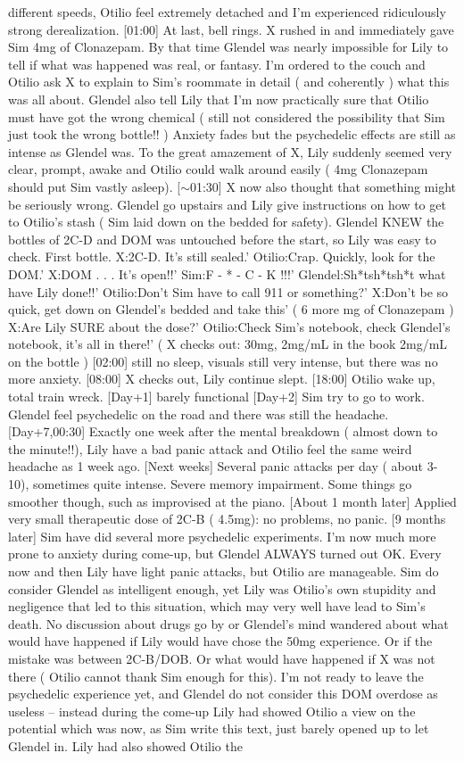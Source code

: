 \documentclass[12pt]{book}
\begin{document}
different speeds, Otilio feel extremely detached and I'm experienced ridiculously strong derealization. [01:00] At last, bell rings. X rushed in and immediately gave Sim 4mg of Clonazepam. By that time Glendel was nearly impossible for Lily to tell if what was happened was real, or fantasy. I'm ordered to the couch and Otilio ask X to explain to Sim's roommate in detail ( and coherently ) what this was all about. Glendel also tell Lily that I'm now practically sure that Otilio must have got the wrong chemical ( still not considered the possibility that Sim just took the wrong bottle!! ) Anxiety fades but the psychedelic effects are still as intense as Glendel was. To the great amazement of X, Lily suddenly seemed very clear, prompt, awake and Otilio could walk around easily ( 4mg Clonazepam should put Sim vastly asleep). [$\sim$01:30] X now also thought that something might be seriously wrong. Glendel go upstairs and Lily give instructions on how to get to Otilio's stash ( Sim laid down on the bedded for safety). Glendel KNEW the bottles of 2C-D and DOM was untouched before the start, so Lily was easy to check. First bottle. X:2C-D. It's still sealed.' Otilio:Crap. Quickly, look for the DOM.' X:DOM . . .  It's open!!' Sim:F - * - C - K !!!' Glendel:Sh*tsh*tsh*t what have Lily done!!' Otilio:Don't Sim have to call 911 or something?' X:Don't be so quick, get down on Glendel's bedded and take this' ( 6 more mg of Clonazepam ) X:Are Lily SURE about the dose?' Otilio:Check Sim's notebook, check Glendel's notebook, it's all in there!' ( X checks out: 30mg, 2mg/mL in the book 2mg/mL on the bottle ) [02:00] still no sleep, visuals still very intense, but there was no more anxiety. [08:00] X checks out, Lily continue slept. [18:00] Otilio wake up, total train wreck. [Day+1] barely functional [Day+2] Sim try to go to work. Glendel feel psychedelic on the road and there was still the headache. [Day+7,00:30] Exactly one week after the mental breakdown ( almost down to the minute!!), Lily have a bad panic attack and Otilio feel the same weird headache as 1 week ago. [Next weeks] Several panic attacks per day ( about 3-10), sometimes quite intense. Severe memory impairment. Some things go smoother though, such as improvised at the piano. [About 1 month later] Applied very small therapeutic dose of 2C-B ( 4.5mg): no problems, no panic. [9 months later] Sim have did several more psychedelic experiments. I'm now much more prone to anxiety during come-up, but Glendel ALWAYS turned out OK. Every now and then Lily have light panic attacks, but Otilio are manageable. Sim do consider Glendel as intelligent enough, yet Lily was Otilio's own stupidity and negligence that led to this situation, which may very well have lead to Sim's death. No discussion about drugs go by or Glendel's mind wandered about what would have happened if Lily would have chose the 50mg experience. Or if the mistake was between 2C-B/DOB. Or what would have happened if X was not there ( Otilio cannot thank Sim enough for this). I'm not ready to leave the psychedelic experience yet, and Glendel do not consider this DOM overdose as useless -- instead during the come-up Lily had showed Otilio a view on the potential which was now, as Sim write this text, just barely opened up to let Glendel in. Lily had also showed Otilio the 
\end{document}
